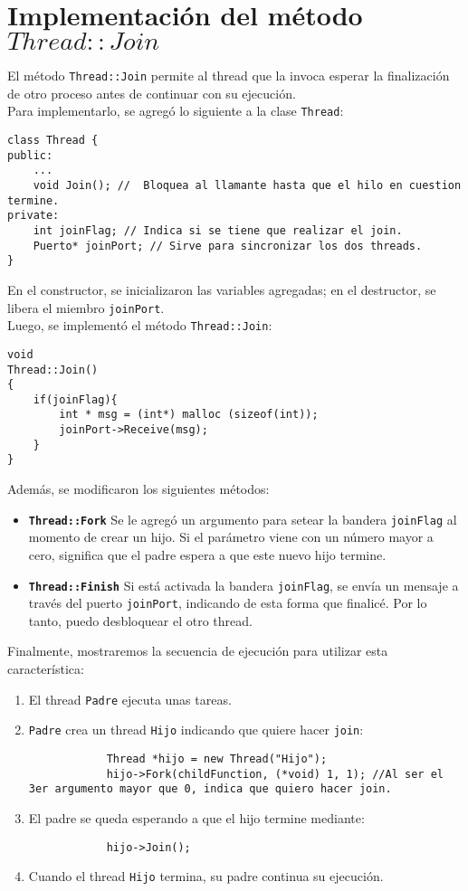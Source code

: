 \section{Implementación del método $Thread::Join$}
El método \texttt{Thread::Join} permite al thread que la invoca esperar la finalización de otro proceso antes de continuar con su ejecución.\\
Para implementarlo, se agregó lo siguiente a la clase \texttt{Thread}:
\begin{lstlisting}[style=C]
class Thread {
public:
	...
	void Join(); //  Bloquea al llamante hasta que el hilo en cuestion termine.
private:
	int joinFlag; // Indica si se tiene que realizar el join.
	Puerto* joinPort; // Sirve para sincronizar los dos threads.
}
\end{lstlisting}
En el constructor, se inicializaron las variables agregadas; en el destructor, se libera el miembro \texttt{joinPort}.\\
Luego, se implementó el método \texttt{Thread::Join}:
\begin{lstlisting}
void
Thread::Join()
{
    if(joinFlag){
        int * msg = (int*) malloc (sizeof(int));
        joinPort->Receive(msg);
    }
}
\end{lstlisting}
Además, se modificaron los siguientes métodos:
\begin{itemize}
	\item \textbf{\texttt{Thread::Fork}} Se le agregó un argumento para setear la bandera \texttt{joinFlag} al momento de crear un hijo. Si el parámetro viene con un número mayor a cero, significa que el padre espera a que este nuevo hijo termine.
	\item \textbf{\texttt{Thread::Finish}} Si está activada la bandera \texttt{joinFlag}, se envía un mensaje a través del puerto \texttt{joinPort}, indicando de esta forma que finalicé. Por lo tanto, puedo desbloquear el otro thread.
\end{itemize}
Finalmente, mostraremos la secuencia de ejecución para utilizar esta característica:
\begin{enumerate}
    \item El thread \texttt{Padre} ejecuta unas tareas.
    \item \texttt{Padre} crea un thread \texttt{Hijo} indicando que quiere hacer \texttt{join}:
        \begin{lstlisting}
            Thread *hijo = new Thread("Hijo");
            hijo->Fork(childFunction, (*void) 1, 1); //Al ser el 3er argumento mayor que 0, indica que quiero hacer join.
         \end{lstlisting}
    \item El padre se queda esperando a que el hijo termine mediante:
        \begin{lstlisting}
            hijo->Join();
        \end{lstlisting}
    \item Cuando el thread \texttt{Hijo} termina, su padre continua su ejecución.
\end{enumerate}
